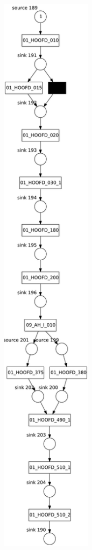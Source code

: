 \begin{figure}[htp]
	\centering
	\begin{subfigure}[b]{0.45\textwidth}
		\centering
		\includegraphics[width=0.7\textwidth, height=0.9\textheight]{figures/evaluation/BPI_1_40_M3_figure.pdf}

\end{subfigure}
\end{figure}
